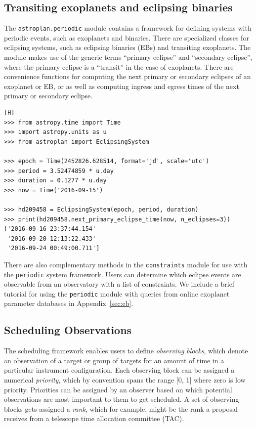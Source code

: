 \subsection{Transiting exoplanets and eclipsing binaries}

The \texttt{astroplan.periodic} module contains a framework for defining systems with periodic events, such as exoplanets and binaries. There are specialized classes for eclipsing systems, such as eclipsing binaries (EBs) and transiting exoplanets. The module makes use of the generic terms ``primary eclipse'' and ``secondary eclipse'', where the primary eclipse is a ``transit'' in the case of exoplanets. There are convenience functions for computing the next primary or secondary eclipses of an exoplanet or EB, or as well as computing ingress and egress times of the next primary or secondary eclipse.
\begin{lstlisting}[caption=Find upcoming exoplanet transit times][H]
>>> from astropy.time import Time
>>> import astropy.units as u
>>> from astroplan import EclipsingSystem

>>> epoch = Time(2452826.628514, format='jd', scale='utc')
>>> period = 3.52474859 * u.day
>>> duration = 0.1277 * u.day
>>> now = Time('2016-09-15')

>>> hd209458 = EclipsingSystem(epoch, period, duration)
>>> print(hd209458.next_primary_eclipse_time(now, n_eclipses=3))
['2016-09-16 23:37:44.154' 
 '2016-09-20 12:13:22.433' 
 '2016-09-24 00:49:00.711']
\end{lstlisting}

There are also complementary methods in the \texttt{constraints} module for use with the \texttt{periodic} system framework. Users can determine which eclipse events are observable from an observatory with a list of constraints. We include a brief tutorial for using the \texttt{periodic} module with queries from online exoplanet parameter databases in Appendix~\ref{sec:eb}.


\subsection{Scheduling Observations}

The scheduling framework enables users to define \textit{observing blocks}, which denote an observation of a target or group of targets for an amount of time in a particular instrument configuration. Each observing block can be assigned a numerical \textit{priority}, which by convention spans the range [0, 1] where zero is low priority. Priorities can be assigned by an observer based on which potential observations are most important to them to get scheduled. A set of observing blocks gets assigned a \textit{rank}, which for example, might be the rank a proposal receives from a telescope time allocation committee (TAC). 

